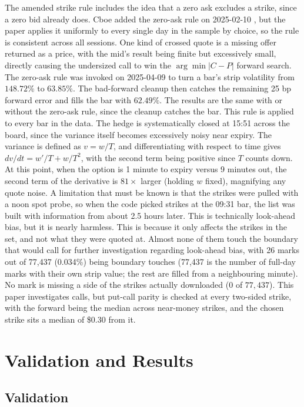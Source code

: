 \documentclass[11pt]{article}
\begin{document}

The amended strike rule includes the idea that a zero ask excludes a strike, since a zero bid already does. Cboe added the zero-ask rule on 2025-02-10 \cite{cboemath}, but the paper applies it uniformly to every single day in the sample by choice, so the rule is consistent across all sessions.
One kind of crossed quote is a missing offer returned as a price, with the mid's result being finite but excessively small, directly causing the undersized call to win the $\arg\min|C-P|$ forward search.
The zero-ask rule was invoked on 2025-04-09 to turn a bar's strip volatility from $148.72\%$ to $63.85\%$. The bad-forward cleanup then catches the remaining 25 bp forward error and fills the bar with $62.49\%$. The results are the same with or without the zero-ask rule, since the cleanup catches the bar.
This rule is applied to every bar in the data.
The hedge is systematically closed at 15:51 across the board, since the variance itself becomes excessively noisy near expiry.
The variance is defined as $v = w/T$, and differentiating with respect to time gives $dv/dt = w'/T + w/T^{2}$, with the second term being positive since $T$ counts down.
At this point, when the option is 1 minute to expiry versus 9 minutes out, the second term of the derivative is $81\times$ larger (holding $w$ fixed), magnifying any quote noise.
A limitation that must be known is that the strikes were pulled with a noon spot probe, so when the code picked strikes at the 09:31 bar, the list was built with information from about 2.5 hours later.
This is technically look-ahead bias, but it is nearly harmless.
This is because it only affects the strikes in the set, and not what they were quoted at.
Almost none of them touch the boundary that would call for further investigation regarding look-ahead bias, with 26 marks out of 77,437 (0.034\%) being boundary touches (77,437 is the number of full-day marks with their own strip value; the rest are filled from a neighbouring minute).
No mark is missing a side of the strikes actually downloaded (0 of $77{,}437$).
This paper investigates calls, but put-call parity is checked at every two-sided strike, with the forward being the median across near-money strikes, and the chosen strike sits a median of \$0.30 from it.

\section{Validation and Results} \subsection{Validation} \label{sec:validation}
\end{document}

